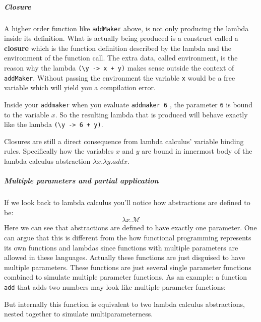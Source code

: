 \subparagraph{Closure}\label{functional-programming-paradigm.md__closure}

A higher order function like \texttt{addMaker} above, is not only
producing the lambda inside its definition. What is actually being
produced is a construct called a \textbf{closure} which is the function
definition described by the lambda and the environment of the function
call. The extra data, called environment, is the reason why the lambda
\texttt{(\textbackslash{}y\ -\textgreater{}\ x\ +\ y)} makes sense
outside the context of \texttt{addMaker}. Without passing the
environment the variable \texttt{x} would be a free variable which will
yield you a compilation error.

Inside your \texttt{addmaker} when you evaluate \texttt{addmaker\ 6} ,
the parameter \texttt{6} is bound to the variable \(x\). So the
resulting lambda that is produced will behave exactly like the lambda
\texttt{(\textbackslash{}y\ -\textgreater{}\ 6\ +\ y)}.

Closures are still a direct consequence from lambda calculus' variable
binding rules. Specifically how the variables \(x\) and \(y\) are bound
in innermost body of the lambda calculus abstraction
\(\lambda x.\lambda y. addx\).

\subparagraph{Multiple parameters and partial
application}\label{functional-programming-paradigm.md__multiple-parameters-and-partial-application}

If we look back to lambda calculus you'll notice how abstractions are
defined to be: \[
\lambda x. \mathscr{M}
\] Here we can see that abstractions are defined to have exactly one
parameter. One can argue that this is different from the how functional
programming represents its own functions and lambdas since functions
with multiple parameters are allowed in these languages. Actually these
functions are just disguised to have multiple parameters. These
functions are just several single parameter functions combined to
simulate multiple parameter functions. As an example: a function
\texttt{add} that adds two numbers may look like multiple parameter
functions:

\begin{Shaded}
\begin{Highlighting}[]
\OtherTok{=}\OperatorTok{+}
\end{Highlighting}
\end{Shaded}

But internally this function is equivalent to two lambda calculus
abstractions, nested together to simulate multiparameterness.

